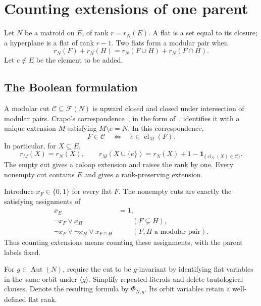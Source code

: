 \documentclass[11pt]{article}
\theoremstyle{definition}
\DeclareMathOperator{\Aut}{Aut}
\DeclareMathOperator{\cl}{cl}
\newcommand{\Fl}{\mathcal F}
\newcommand{\ind}{\mathbf 1}
\begin{document}
\section{Counting extensions of one parent}\label{sec:cuts}

Let $N$ be a matroid on $E$, of rank $r=r_N(E)$.
A flat is a set equal to its closure; a hyperplane is a flat
of rank $r-1$. Two flats form a modular pair when
\begin{equation}\label{eq:modular-pair}
r_N(F)+r_N(H)=r_N(F\cup H)+r_N(F\cap H).
\end{equation}
Let $e\notin E$ be the element to be added.

\subsection{The Boolean formulation}

A modular cut $\mathcal C\subseteq\Fl(N)$ is upward closed and closed under
intersection of modular pairs. Crapo's correspondence~\cite{Crapo}, in the
form of~\cite[Theorem 7.2.3]{Oxley}, identifies
it with a unique extension $M$ satisfying $M\setminus e=N$. In this
correspondence,
\begin{equation}\label{eq:cut-meaning}
F\in\mathcal C\quad\Longleftrightarrow\quad e\in\cl_M(F).
\end{equation}
In particular, for $X\subseteq E$,
\begin{equation}\label{eq:extension-rank}
r_M(X)=r_N(X),\qquad
r_M(X\cup\{e\})=r_N(X)+1-\ind_{\{\cl_N(X)\in\mathcal C\}}.
\end{equation}
The empty cut gives a coloop extension and raises the rank by one.
Every nonempty cut contains $E$ and gives a rank-preserving extension.

Introduce $x_F\in\{0,1\}$ for every flat $F$. The nonempty cuts are exactly
the satisfying assignments of
\begin{align}
x_E&=1,\label{eq:top}\\
\neg x_F\lor x_H&\qquad(F\subsetneq H),\label{eq:upward}\\
\neg x_F\lor\neg x_H\lor x_{F\cap H}
&\qquad(F,H\text{ a modular pair}).\label{eq:cut-clause}
\end{align}
Thus counting extensions means counting these assignments, with the parent
labels fixed.

For $g\in\Aut(N)$, require the cut to be $g$-invariant by identifying flat
variables in the same orbit under $\langle g\rangle$. Simplify repeated
literals and delete tautological clauses. Denote the resulting formula by
$\Phi_{N,g}$. Its orbit variables retain a well-defined flat rank.
\end{document}

